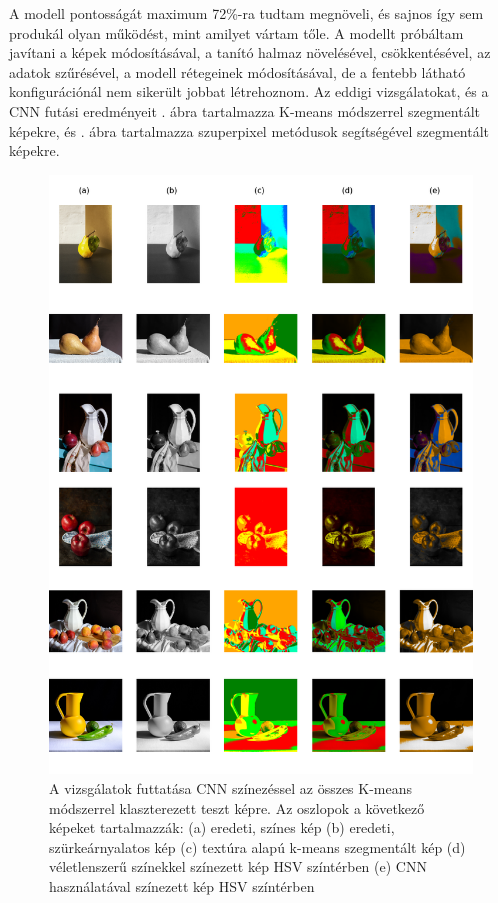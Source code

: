 A modell pontosságát maximum 72\%-ra tudtam megnöveli, és sajnos így sem produkál olyan működést, mint amilyet vártam tőle. A modellt próbáltam javítani a képek módosításával, a tanító halmaz növelésével, csökkentésével, az adatok szűrésével, a modell rétegeinek módosításával, de a fentebb látható konfigurációnál nem sikerült jobbat létrehoznom. Az eddigi vizsgálatokat, és a CNN futási eredményeit . ábra tartalmazza K-means módszerrel szegmentált képekre, és . ábra tartalmazza szuperpixel metódusok segítségével szegmentált képekre.

\begin{figure}[h]
\centering
\includegraphics[scale=0.5]{images/result_all_kmeans.png}
\caption{A vizsgálatok futtatása CNN színezéssel az összes K-means módszerrel klaszterezett teszt képre. Az oszlopok a következő képeket tartalmazzák: (a) eredeti, színes kép (b) eredeti, szürkeárnyalatos kép (c) textúra alapú k-means szegmentált kép (d) véletlenszerű színekkel színezett kép HSV színtérben (e) CNN használatával színezett kép HSV színtérben }
\label{fig:result_all_kmeans}
\end{figure}

